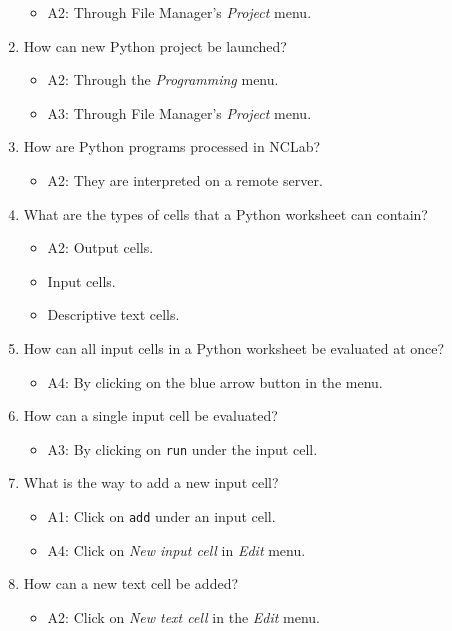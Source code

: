 \documentclass[article,A4,12pt]{llncs}
\begin{document}
\begin{enumerate}
  \begin{itemize}
    \item A2: Through File Manager's {\em Project} menu.
  \end{itemize}
\item How can new Python project be launched?
  \begin{itemize}
    \item A2: Through the {\em Programming} menu.
    \item A3: Through File Manager's {\em Project} menu.
  \end{itemize}
\item How are Python programs processed in NCLab?
  \begin{itemize}
    \item A2: They are interpreted on a remote server.
  \end{itemize}
\item  What are the types of cells that a Python worksheet can contain?
  \begin{itemize}
    \item A2: Output cells.
    \item Input cells.
    \item Descriptive text cells.
  \end{itemize}
\item How can all input cells in a Python worksheet be evaluated at once?
  \begin{itemize}
    \item A4: By clicking on the blue arrow button in the menu.
  \end{itemize}
\item How can a single input cell be evaluated?
  \begin{itemize}
    \item A3: By clicking on {\tt run} under the input cell.
  \end{itemize}
\item What is the way to add a new input cell?
  \begin{itemize}
    \item A1: Click on {\tt add} under an input cell. 
    \item A4: Click on {\em New input cell} in {\em Edit} menu.
  \end{itemize}
\item How can a new text cell be added?
  \begin{itemize}
    \item A2: Click on {\em New text cell} in the {\em Edit} menu.

\end{itemize}
\end{enumerate}
\end{document}
